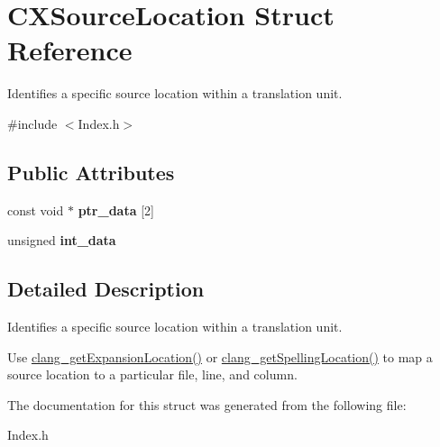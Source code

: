 \hypertarget{structCXSourceLocation}{}\section{C\+X\+Source\+Location Struct Reference}
\label{structCXSourceLocation}


Identifies a specific source location within a translation unit.  




{\ttfamily \#include $<$Index.\+h$>$}

\subsection*{Public Attributes}
\begin{DoxyCompactItemize}
\item 
\mbox{\label{structCXSourceLocation_ac2d5c300a87d200e6542be4a557014a1}} 
const void $\ast$ {\bfseries ptr\+\_\+data} \mbox{[}2\mbox{]}
\item 
\mbox{\label{structCXSourceLocation_ae5a410c0b0b7685f9eca069868e4dc91}} 
unsigned {\bfseries int\+\_\+data}
\end{DoxyCompactItemize}


\subsection{Detailed Description}
Identifies a specific source location within a translation unit. 

Use \mbox{\hyperlink{group__CINDEX__LOCATIONS_gadee4bea0fa34550663e869f48550eb1f}{clang\+\_\+get\+Expansion\+Location()}} or \mbox{\hyperlink{group__CINDEX__LOCATIONS_ga01f1a342f7807ea742aedd2c61c46fa0}{clang\+\_\+get\+Spelling\+Location()}} to map a source location to a particular file, line, and column. 

The documentation for this struct was generated from the following file\+:\begin{DoxyCompactItemize}
\item 
Index.\+h\end{DoxyCompactItemize}
